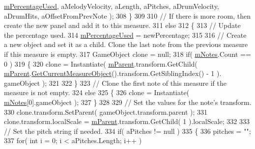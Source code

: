 \begin{DoxyCode}
      \hyperlink{class_song_creation_1_1_measure_display_panel_a87241a464e8e3ed8ad9011fcebaec50a}{mPercentageUsed}, aMelodyVelocity, aLength, aPitches, aDrumVelocity, aDrumHits, 
      aOffsetFromPrevNote );
308                 \}
309 
310                 \textcolor{comment}{// If there is more room, then create the new panel and add it to this measure.}
311                 \textcolor{keywordflow}{else}
312                 \{
313                     \textcolor{comment}{// Update the percentage used.}
314                     \hyperlink{class_song_creation_1_1_measure_display_panel_a87241a464e8e3ed8ad9011fcebaec50a}{mPercentageUsed} = newPercentage;
315 
316                     \textcolor{comment}{// Create a new object and set it as a child. Clone the last note from the previous
       measure if this measure is empty.}
317                     GameObject clone = null;
318                     \textcolor{keywordflow}{if}( \hyperlink{class_song_creation_1_1_measure_display_panel_a096dfc8481f3defcdcb57bfc140ac953}{mNotes}.Count == 0 )
319                     \{
320                         clone = Instantiate( \hyperlink{class_song_creation_1_1_measure_display_panel_a997c583ac0b9687ff9399c9ed27d0dcb}{mParent}.transform.GetChild( 
      \hyperlink{class_song_creation_1_1_measure_display_panel_a997c583ac0b9687ff9399c9ed27d0dcb}{mParent}.\hyperlink{class_song_creation_1_1_note_display_container_a72a72e35af39cad274edbf2acb6fbd2e}{GetCurrentMeasureObject}().transform.GetSiblingIndex() - 1 ).
      gameObject );
321 
322                     \}
323                     \textcolor{comment}{// Clone the first note of this measure if the measure is not empty.}
324                     \textcolor{keywordflow}{else}
325                     \{
326                         clone = Instantiate( \hyperlink{class_song_creation_1_1_measure_display_panel_a096dfc8481f3defcdcb57bfc140ac953}{mNotes}[0].gameObject );
327                     \}
328 
329                     \textcolor{comment}{// Set the values for the note's transform.}
330                     clone.transform.SetParent( gameObject.transform.parent );
331                     clone.transform.localScale = \hyperlink{class_song_creation_1_1_measure_display_panel_a997c583ac0b9687ff9399c9ed27d0dcb}{mParent}.transform.GetChild( 1 ).localScale;
332 
333                     \textcolor{comment}{// Set the pitch string if needed.}
334                     \textcolor{keywordflow}{if}( aPitches != null )
335                     \{
336                         pitches = \textcolor{stringliteral}{""};
337                         \textcolor{keywordflow}{for}( \textcolor{keywordtype}{int} i = 0; i < aPitches.Length; i++ )

\end{DoxyCode}

